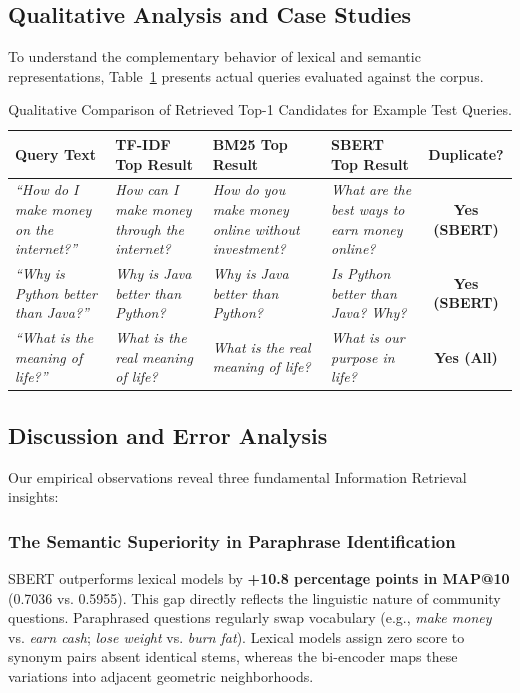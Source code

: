 \documentclass[11pt,a4paper]{article}
\begin{document}
\subsection{Qualitative Analysis and Case Studies}
To understand the complementary behavior of lexical and semantic representations, Table~\ref{tab:qualitative_examples} presents actual queries evaluated against the corpus.

\begin{table}[h]
\centering
\scriptsize
\caption{Qualitative Comparison of Retrieved Top-1 Candidates for Example Test Queries.}
\label{tab:qualitative_examples}
\begin{tabularx}{\textwidth}{p{3.2cm}p{3.0cm}p{3.4cm}p{3.4cm}c}
\toprule
\textbf{Query Text} & \textbf{TF-IDF Top Result} & \textbf{BM25 Top Result} & \textbf{SBERT Top Result} & \textbf{Duplicate?} \\
\midrule
\textit{``How do I make money on the internet?''} & \textit{How can I make money through the internet?} & \textit{How do you make money online without investment?} & \textit{What are the best ways to earn money online?} & \textbf{Yes (SBERT)} \\
\midrule
\textit{``Why is Python better than Java?''} & \textit{Why is Java better than Python?} & \textit{Why is Java better than Python?} & \textit{Is Python better than Java? Why?} & \textbf{Yes (SBERT)} \\
\midrule
\textit{``What is the meaning of life?''} & \textit{What is the real meaning of life?} & \textit{What is the real meaning of life?} & \textit{What is our purpose in life?} & \textbf{Yes (All)} \\
\bottomrule
\end{tabularx}
\end{table}

\subsection{Discussion and Error Analysis}
Our empirical observations reveal three fundamental Information Retrieval insights:

\subsubsection{The Semantic Superiority in Paraphrase Identification}
SBERT outperforms lexical models by \textbf{+10.8 percentage points in MAP@10} (0.7036 vs. 0.5955). This gap directly reflects the linguistic nature of community questions. Paraphrased questions regularly swap vocabulary (e.g., \textit{make money} vs. \textit{earn cash}; \textit{lose weight} vs. \textit{burn fat}). Lexical models assign zero score to synonym pairs absent identical stems, whereas the bi-encoder maps these variations into adjacent geometric neighborhoods.
\end{document}
